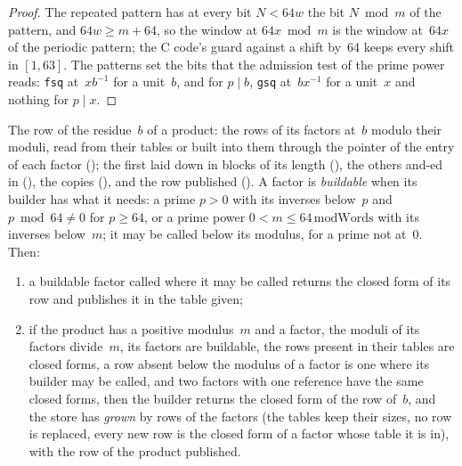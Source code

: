 \begin{proof}
  \leanok
  The repeated pattern has at every bit $N < 64 w$ the bit $N \bmod m$ of the pattern, and
  $64 w \ge m + 64$, so the window at $64 x \bmod m$ is the window at~$64 x$ of the periodic
  pattern; the C code's guard against a shift by~64 keeps every shift in $[1, 63]$. The patterns
  set the bits that the admission test of the prime power reads: \verb|fsq| at~$x b^{-1}$ for a
  unit~$b$, and for $p \mid b$, \verb|gsq| at~$b x^{-1}$ for a unit~$x$ and nothing for $p \mid x$.
\end{proof}

\begin{lemma}\label{lem:productRows}
  \leanok
  The row of the residue~$b$ of a product: the rows of its factors at~$b$ modulo their moduli, read
  from their tables or built into them through the pointer of the entry of each factor
  (); the first laid down in blocks of its length
  (), the others and-ed in (), the copies
  (), and the row published (). A factor is
  \emph{buildable} when its builder has what it needs: a prime $p > 0$ with its inverses below~$p$
  and $p \bmod 64 \ne 0$ for $p \ge 64$, or a prime power $0 < m \le 64\,\mathrm{modWords}$ with
  its inverses below~$m$; it may be called below its modulus, for a prime not at~$0$. Then:
  \begin{enumerate}
    \item a buildable factor called where it may be called returns the closed form of its row and
      publishes it in the table given;
    \item if the product has a positive modulus~$m$ and a factor, the moduli of its factors
      divide~$m$, its factors are buildable, the rows present in their tables are closed forms, a
      row absent below the modulus of a factor is one where its builder may be called, and two
      factors with one reference have the same closed forms, then the builder returns the closed
      form of the row of~$b$, and the store has \emph{grown} by rows of the factors (the tables
      keep their sizes, no row is replaced, every new row is the closed form of a factor whose
      table it is in), with the row of the product published.
  \end{enumerate}
\end{lemma}

